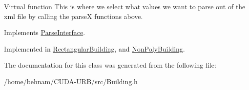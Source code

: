 Virtual function This is where we select what values we want to parse out of the xml file by calling the parseX functions above. 

Implements \hyperlink{classParseInterface_afca32108192ba0997c9e5a78189b0cbc}{Parse\+Interface}.



Implemented in \hyperlink{classRectangularBuilding_adbc6b832c817fc06f9bc2e51561a7e81}{Rectangular\+Building}, and \hyperlink{classNonPolyBuilding_ace133756e0233d75b434fec5273b4414}{Non\+Poly\+Building}.



The documentation for this class was generated from the following file\+:\begin{DoxyCompactItemize}
\item 
/home/behnam/\+C\+U\+D\+A-\/\+U\+R\+B/src/Building.\+h\end{DoxyCompactItemize}
